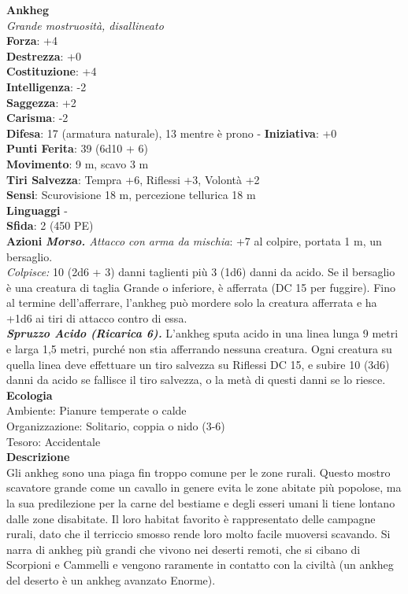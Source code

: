 \begin{multicols}{2}
\medskip\textbf{Ankheg}\\
\emph{Grande mostruosità, disallineato}\\
\textbf{Forza}: +4\\
\textbf{Destrezza}: +0\\
\textbf{Costituzione}: +4\\
\textbf{Intelligenza}: -2\\
\textbf{Saggezza}: +2\\
\textbf{Carisma}: -2\\
\textbf{Difesa}: 17 (armatura naturale), 13 mentre è prono - \textbf{Iniziativa}: +0\\
\textbf{Punti Ferita}: 39 (6d10 + 6)\\
\textbf{Movimento}: 9 m, scavo 3 m\\
\textbf{Tiri Salvezza}: Tempra +6, Riflessi +3, Volontà +2\\
\textbf{Sensi}: Scurovisione 18 m, percezione tellurica 18 m\\
\textbf{Linguaggi} -\\
\textbf{Sfida}: 2 (450 PE)\smallskip\\
\smallskip\textbf{Azioni}
\emph{\textbf{Morso.} Attacco con arma da mischia}: +7 al colpire, portata 1 m, un bersaglio.\\
\emph{Colpisce:} 10 (2d6 + 3) danni taglienti più 3 (1d6) danni da acido. Se il bersaglio è una creatura di taglia Grande o inferiore, è afferrata (DC  15 per fuggire). Fino al termine dell'afferrare, l'ankheg può mordere solo la creatura afferrata e ha +1d6 ai tiri di attacco contro di essa.\\
\emph{\textbf{Spruzzo Acido (Ricarica 6).}} L'ankheg sputa acido in una linea lunga 9 metri e larga 1,5 metri, purché non stia afferrando nessuna creatura. Ogni creatura su quella linea deve effettuare un tiro salvezza su Riflessi DC  15, e subire 10 (3d6) danni da acido se fallisce il tiro salvezza, o la metà di questi danni se lo riesce.\\
\textbf{Ecologia}\\
Ambiente: Pianure temperate o calde\\
Organizzazione: Solitario, coppia o nido (3-6)\\
Tesoro: Accidentale\\
\textbf{Descrizione}\\
Gli ankheg sono una piaga fin troppo comune per le zone rurali. Questo mostro scavatore grande come un cavallo in genere evita le zone abitate più popolose, ma la sua predilezione per la carne del bestiame e degli esseri umani li tiene lontano dalle zone disabitate. Il loro habitat favorito è rappresentato delle campagne rurali, dato che il terriccio smosso rende loro molto facile muoversi scavando. Si narra di ankheg più grandi che vivono nei deserti remoti, che si cibano di Scorpioni e Cammelli e vengono raramente in contatto con la civiltà (un ankheg del deserto è un ankheg avanzato Enorme).\\

\end{multicols}

